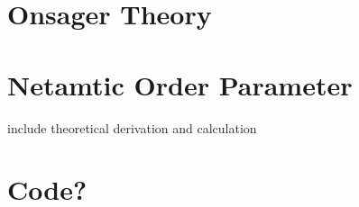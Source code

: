 \documentclass[11pt, a4paper]{article} %
\begin{document}
\printbibliography

\begin{appendices}

\section{Onsager Theory}
\section{Netamtic Order Parameter}
include theoretical derivation and calculation

\section{Code?}

\end{appendices}
\end{document}
